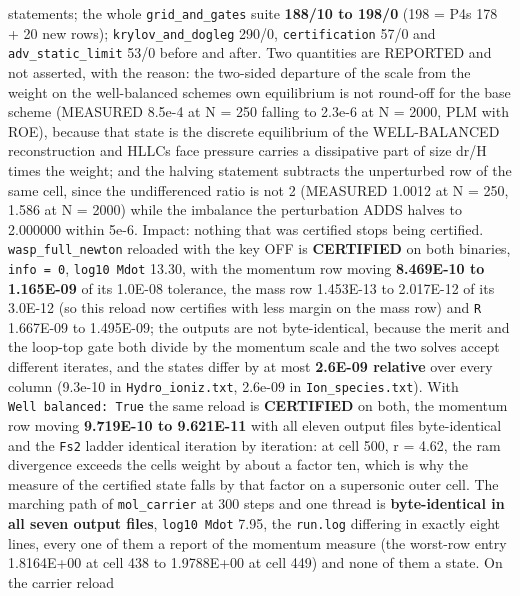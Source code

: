 \documentclass[english,a4paper]{my_memo}
\begin{document}
\begin{itemize}
  statements; the whole \texttt{grid\_and\_gates} suite \textbf{188/10 to 198/0} (198 =
  P4\textquotesingle s 178 + 20 new rows); \texttt{krylov\_and\_dogleg} 290/0, \texttt{certification} 57/0 and
  \texttt{adv\_static\_limit} 53/0 before and after. Two quantities are REPORTED and
  not asserted, with the reason: the two-sided departure of the scale from the
  weight on the well-balanced scheme\textquotesingle s own equilibrium is not round-off for the base scheme
  (MEASURED 8.5e-4 at N = 250 falling to 2.3e-6 at N = 2000, PLM with ROE),
  because that state is the discrete equilibrium of the WELL-BALANCED reconstruction
  and HLLC\textquotesingle s face pressure carries a dissipative part of size dr/H times the
  weight; and the halving statement subtracts the unperturbed row of the same
  cell, since the undifferenced ratio is not 2 (MEASURED 1.0012 at N = 250,
  1.586 at N = 2000) while the imbalance the perturbation ADDS halves to
  2.000000 within 5e-6. Impact: nothing that was certified stops being
  certified. \texttt{wasp\_full\_newton} reloaded with the key OFF is \textbf{CERTIFIED} on
  both binaries, \texttt{info\ =\ 0}, \texttt{log10\ Mdot} 13.30, with the momentum row moving
  \textbf{8.469E-10 to 1.165E-09} of its 1.0E-08 tolerance, the mass row 1.453E-13
  to 2.017E-12 of its 3.0E-12 (so this reload now certifies with less margin
  on the mass row) and \texttt{\textbar{}\textbar{}R\textbar{}\textbar{}} 1.667E-09 to 1.495E-09; the outputs are not
  byte-identical, because the merit and the loop-top gate both divide by the
  momentum scale and the two solves accept different iterates, and the states
  differ by at most \textbf{2.6E-09 relative} over every column (9.3e-10 in
  \texttt{Hydro\_ioniz.txt}, 2.6e-09 in \texttt{Ion\_species.txt}). With \texttt{Well\ balanced:\ True} the same reload is \textbf{CERTIFIED} on both, the momentum row moving
  \textbf{9.719E-10 to 9.621E-11} with all eleven output files byte-identical and
  the \texttt{\textbar{}\textbar{}Fs\textbar{}\textbar{}2} ladder identical iteration by iteration: at cell 500,
  r = 4.62, the ram divergence exceeds the cell\textquotesingle s weight by about a factor
  ten, which is why the measure of the certified state falls by that factor on
  a supersonic outer cell. The marching path of \texttt{mol\_carrier} at 300 steps and
  one thread is \textbf{byte-identical in all seven output files}, \texttt{log10\ Mdot}
  7.95, the \texttt{run.log} differing in exactly eight lines, every one of them a
  report of the momentum measure (the worst-row entry 1.8164E+00 at cell 438
  to 1.9788E+00 at cell 449) and none of them a state. On the carrier reload

\end{itemize}
\end{document}
